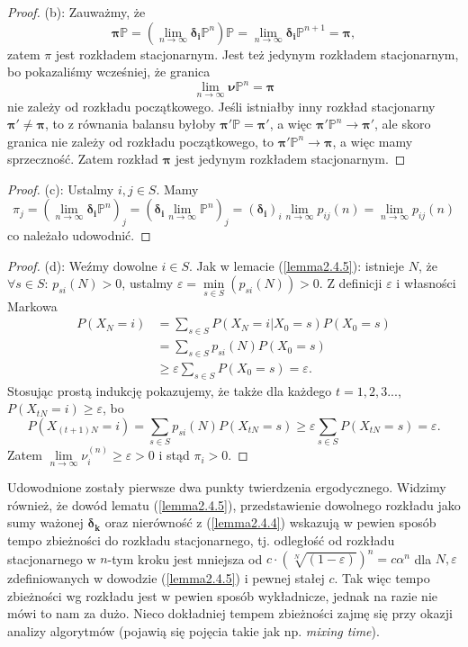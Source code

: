 \documentclass[a4paper]{article}
\theoremstyle{defn}
\theoremstyle{theorem}
\theoremstyle{lemma}
\theoremstyle{cor}
\theoremstyle{fact}
\begin{document}
\begin{proof}
(b): Zauważmy, że $$\boldsymbol{\pi}\mathbb{P} = (\lim\limits_{n \to \infty} \boldsymbol{\delta_i}\mathbb{P}^n)\mathbb{P} = \lim\limits_{n \to \infty} \boldsymbol{\delta_i}\mathbb{P}^{n+1} = \boldsymbol{\pi},$$ zatem $\pi$ jest rozkładem stacjonarnym.
Jest też jedynym rozkładem stacjonarnym, bo pokazaliśmy wcześniej, że granica $$\lim\limits_{n \to \infty} \boldsymbol{\nu}\mathbb{P}^n = \boldsymbol{\pi}$$ nie zależy od rozkładu początkowego. Jeśli istniałby inny rozkład stacjonarny $\boldsymbol{\pi'} \neq \boldsymbol{\pi}$, to z równania balansu byłoby $\boldsymbol{\pi'}\mathbb{P} = \boldsymbol{\pi'}$, a więc $\boldsymbol{\pi'}\mathbb{P}^n \to \boldsymbol{\pi'}$, ale skoro granica nie zależy od rozkładu początkowego, to $\boldsymbol{\pi'}\mathbb{P}^n \to \boldsymbol{\pi}$, a więc mamy sprzeczność. Zatem rozkład $\boldsymbol{\pi}$ jest jedynym rozkładem stacjonarnym.
\end{proof}
\begin{proof}
(c): Ustalmy $i,j \in S$. Mamy $$\pi_j = (\lim\limits_{n \to \infty} \boldsymbol{\delta_i}\mathbb{P}^n)_j = (\boldsymbol{\delta_i} \lim\limits_{n \to \infty} \mathbb{P}^n)_j = (\boldsymbol{\delta_i})_i \lim\limits_{n \to \infty} p_{ij}(n) = \lim\limits_{n \to \infty} p_{ij}(n)$$ co należało udowodnić.
\end{proof}
\begin{proof}
(d): Weźmy dowolne $i \in S$. Jak w lemacie (\ref{lemma2.4.5}): istnieje $N$, że $\forall s \in S:\, p_{si}(N) > 0$, ustalmy $\varepsilon = \min\limits_{s \in S}(p_{si}(N)) > 0$. Z definicji $\varepsilon$ i własności Markowa
\begin{align*}
P(X_N = i) &= \sum\limits_{s \in S} P(X_N = i|X_0 = s)P(X_0 = s) \\
&= \sum\limits_{s \in S} p_{si}(N)P(X_0 = s) \\
&\geq \varepsilon \sum\limits_{s \in S} P(X_0 = s) = \varepsilon.
\end{align*}
Stosując prostą indukcję pokazujemy, że także dla każdego $t = 1,2,3...$, $P(X_{tN} = i) \geq \varepsilon$, bo
$$P(X_{(t+1)N} = i) = \sum\limits_{s \in S} p_{si}(N)P(X_{tN} = s) \geq \varepsilon \sum\limits_{s \in S} P(X_{tN} = s) = \varepsilon.$$
Zatem $\lim\limits_{n \to \infty} \nu_i^{(n)} \geq \varepsilon > 0$ i stąd $\pi_i > 0$.
\end{proof}
Udowodnione zostały pierwsze dwa punkty twierdzenia ergodycznego. Widzimy również, że dowód lematu (\ref{lemma2.4.5}), przedstawienie dowolnego rozkładu jako sumy ważonej $\boldsymbol{\delta_k}$ oraz nierówność z (\ref{lemma2.4.4}) wskazują w pewien sposób tempo zbieżności do rozkładu stacjonarnego, tj. odległość od rozkładu stacjonarnego w $n$-tym kroku jest mniejsza od $c \cdot (\sqrt[N]{(1-\varepsilon)})^n = c\alpha^n$ dla $N, \varepsilon$ zdefiniowanych w dowodzie (\ref{lemma2.4.5}) i pewnej stałej $c$. Tak więc tempo zbieżności wg rozkładu jest w pewien sposób wykładnicze, jednak na razie nie mówi to nam za dużo. Nieco dokładniej tempem zbieżności zajmę się przy okazji analizy algorytmów (pojawią się pojęcia takie jak np. \textit{mixing time}).
\\\\
\end{document}
